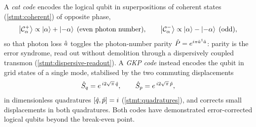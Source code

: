 \begin{statement}
\label{stmt:bosonic-codes}
A \emph{cat code} encodes the logical qubit in superpositions of coherent
states (\cref{stmt:coherent}) of opposite phase,
\begin{equation}
\ket{\mathcal C^+_\alpha}\propto\ket{\alpha}+\ket{-\alpha}
\;(\text{even photon number}),
\qquad
\ket{\mathcal C^-_\alpha}\propto\ket{\alpha}-\ket{-\alpha}
\;(\text{odd}),
\end{equation}
so that photon loss $\hat{a}$ toggles the photon-number parity
$\hat{P}=e^{i\pi\hat{a}^\dagger\hat{a}}$: parity is the error syndrome, read
out without demolition through a dispersively coupled transmon
(\cref{stmt:dispersive-readout}). A \emph{GKP code} instead encodes the
qubit in grid states of a single mode, stabilised by the two commuting
displacements
\begin{equation}
\label{eq:gkp}
\hat{S}_q=e^{\,i2\sqrt{\pi}\,\hat{q}},
\qquad
\hat{S}_p=e^{\,i2\sqrt{\pi}\,\hat{p}},
\end{equation}
in dimensionless quadratures $[\hat{q},\hat{p}]=i$ (\cref{stmt:quadratures}),
and corrects small displacements in both quadratures. Both codes have
demonstrated error-corrected logical qubits beyond the break-even point.
\end{statement}

